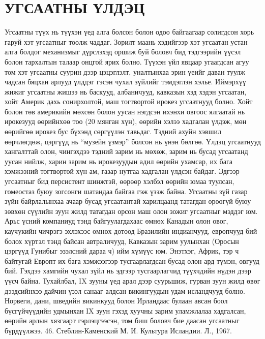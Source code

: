 \section{УГСААТНЫ ҮЛДЭЦ}
Угсаатны түүх нь түүхэн үед алга болсон болон одоо байгаагаар солигдсон хорь гаруй хэт угсаатныг тоолж чаддаг. Зорилт маань хэдийгээр хэт угсаатан устан алга болдог механизмыг дүрслэхэд оршиж буй боловч бид тэдгээрийн үүсэл болон тархалтын талаар онцгой ярих болно. Түүхэн үйл явцаар угаагдсан агуу том хэт угсаатны суурин дээр цэцэглэлт, уналтынхаа эрин үеийг даван туулж чадсан бяцхан арлууд үлддэг гэсэн чухал зүйлийг тэмдэглэн хэлье. Иймэрхүү жижиг угсаатны жишээ нь баскууд, албаничууд, кавказын хэд хэдэн угсаатан, хойт Америк дахь сонирхолтой, маш тогтвортой ирокез угсаатнууд болно. Хойт болон төв америкийн мөхсөн болон уусан нэгдсэн ихэнхи овгоос ялгаатай нь ирокезууд өөрийнхөө тоо (20 мянган хүн), өөрийн хэлээ хадгалан үлдэж, мөн өөрийгөө ирокез бус бүхэнд сөргүүлэн тавьдаг. Тэдний ахуйн хэвшил өөрчлөгдөж, цэргүүд нь “музейн үзмэр” болсон нь үнэн бөлгөө.
Үлдэц угсаатнууд хангалттай олон, чингэхдээ тэдний зарим нь мөхөж, зарим нь бусад угсаатанд уусан нийлж, харин зарим нь ирокезуудын адил өөрийн ухамсар, их бага хэмжээний тогтвортой хүн ам, газар нутгаа хадгалан үлдсэн байдаг. Эдгээр угсаатныг бид персистент шинжтэй, өөрөөр хэлбэл өөрийн юмаа туулсан, гомеостаз буюу зогсонги шатандаа байгаа гэж үзэж байна. Угсаатны зүй газар зүйн байрлалынхаа ачаар бусад угсаатантай харилцаанд татагдан ороогүй буюу зөвхөн сүүлийн зуун жилд татагдан орсон маш олон зожиг угсаатныг мэддэг юм. Арьс үсний компаниуд тэнд байгуулагдахаас өмнөх Канадын олон овог, каучукийн чичрэгэ эхлэхээс өмнөх дотоод Бразилийн индианчууд, европчууд бий болох хүртэл тэнд байсан автраличууд, Кавказын зарим уулынхан (Оросын цэргүүд Гунибыг эзэлсний дараа ч) ийм хүмүүс юм. Энэтхэг, Африк, тэр ч байтугай Европт их бага хэмжээгээр тусгаарлагдсан бусад олон ард түмэн, овгууд бий. Гэхдээ хамгийн чухал зүйл нь эдгээр тусгаарлагчид түүхчдийн нүдэн дээр үүсч байна. Тухайлбал, IX зууны үед арал дээр суурьшиж, гурван зуун жилд өвөг дээдсийнхээ дайчин үзэл санааг алдсан викингуудын удам исландчууд болно. Норвеги, дани, шведийн викинкууд болон Ирландаас булаан авсан боол бүсгүйчүүдийн удмынхан IX зуун гэхэд хуучны зарим уламжлалаа хадгалсан, өөрийн арлын хязгаарт гэрлэцгээсэн, том биш боловч бие даасан угсаатныг бүрдүүлжээ. 46. Стеблин-Каменский М. И. Культура Исландии. Л., 1967.
